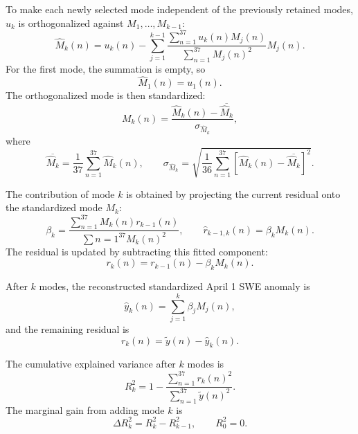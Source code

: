 \documentclass[11pt]{article}
\begin{document}
To make each newly selected mode independent of the previously retained modes, $u_k$ is
orthogonalized against $M_1,\ldots,M_{k-1}$:
\begin{equation}
\widehat{M}_k(n)
=
u_k(n)
-
\sum_{j=1}^{k-1}
\frac{
\sum_{n=1}^{37} u_k(n)M_j(n)
}{
\sum_{n=1}^{37} M_j(n)^2
}
M_j(n).
\label{eq:lod_orthogonalization}
\end{equation}
For the first mode, the summation is empty, so
\begin{equation}
\widehat{M}_1(n)=u_1(n).
\end{equation}
The orthogonalized mode is then standardized:
\begin{equation}
M_k(n)
=
\frac{
\widehat{M}_k(n)-\overline{\widehat{M}_k}
}{
\sigma_{\widehat{M}_k}
},
\label{eq:lod_mode_standardization}
\end{equation}
where
\begin{equation}
\overline{\widehat{M}_k}
=
\frac{1}{37}
\sum_{n=1}^{37}
\widehat{M}_k(n),
\qquad
\sigma_{\widehat{M}_k}
=
\sqrt{
\frac{1}{36}
\sum_{n=1}^{37}
\left[
\widehat{M}_k(n)-\overline{\widehat{M}_k}
\right]^2
}.
\label{eq:lod_mode_mean_std}
\end{equation}

The contribution of mode $k$ is obtained by projecting the current residual onto the standardized
mode $M_k$:
\begin{equation}
\beta_k
=
\frac{
\sum_{n=1}^{37} M_k(n)r_{k-1}(n)
}{
\sum{n=1}^{37} M_k(n)^2
},
\qquad
\widehat{r}_{k-1,k}(n)=\beta_k M_k(n).
\label{eq:lod_projection}
\end{equation}
The residual is updated by subtracting this fitted component:
\begin{equation}
r_k(n)
=
r_{k-1}(n)-\beta_k M_k(n).
\label{eq:lod_residual_update}
\end{equation}

After $k$ modes, the reconstructed standardized April 1 SWE anomaly is
\begin{equation}
\widehat{y}_k(n)
=
\sum_{j=1}^{k}
\beta_j M_j(n),
\label{eq:lod_reconstruction}
\end{equation}
and the remaining residual is
\begin{equation}
r_k(n)
=
\widetilde{y}(n)-\widehat{y}_k(n).
\label{eq:lod_remaining_residual}
\end{equation}

The cumulative explained variance after $k$ modes is
\begin{equation}
R_k^2
=
1
-
\frac{
\sum_{n=1}^{37} r_k(n)^2
}{
\sum_{n=1}^{37} \widetilde{y}(n)^2
}.
\label{eq:lod_cumulative_r2}
\end{equation}
The marginal gain from adding mode $k$ is
\begin{equation}
\Delta R_k^2
=
R_k^2-R_{k-1}^2,
\qquad
R_0^2=0.
\label{eq:lod_incremental_r2}
\end{equation}
\end{document}
